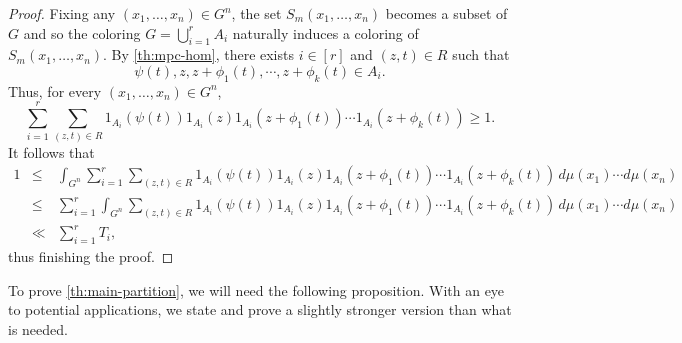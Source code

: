 \begin{proof}
Fixing any $(x_1, \ldots, x_n) \in G^n$, the set $S_m(x_1, \ldots, x_n)$ becomes a subset of $G$ and so the coloring $G = \bigcup_{i=1}^r A_i$ naturally induces a coloring of $S_m(x_1, \ldots, x_n)$. By \cref{th:mpc-hom}, there exists $i \in [r]$ and $(z, t) \in R$ such that
\[
    \psi(t), z, z+ \phi_1(t), \cdots, z+ \phi_k(t) \in A_i.
\]
Thus, for every $(x_1, \ldots, x_n) \in G^n$,
\[
    \sum_{i=1}^r \sum_{(z, t) \in R } 1_{A_i}( \psi(t)) 1_{A_i}(z) 1_{A_i}(z+ \phi_1(t)) \cdots 1_{A_i}(z+ \phi_k(t)) \geq 1.
\]
It follows that
\begin{eqnarray*}
1 & \leq & \int_{G^n} \sum_{i=1}^r \sum_{(z, t) \in R } 1_{A_i}( \psi(t)) 1_{A_i}(z) 1_{A_i}(z+ \phi_1(t)) \cdots 1_{A_i}(z+ \phi_k(t)) \, d\mu(x_1) \cdots d\mu(x_n) \\
&\leq& \sum_{i=1}^r  \int_{G^n} \sum_{(z, t) \in R } 1_{A_i}( \psi(t)) 1_{A_i}(z) 1_{A_i}(z+ \phi_1(t)) \cdots 1_{A_i}(z+ \phi_k(t)) \, d\mu(x_1) \cdots d\mu(x_n)  \\
& \ll & \sum_{i=1}^r T_i,   
\end{eqnarray*}
thus finishing the proof.
\end{proof}

To prove \cref{th:main-partition}, we will need the following proposition. 
With an eye to potential applications, we state and prove a slightly stronger version than what is needed.




